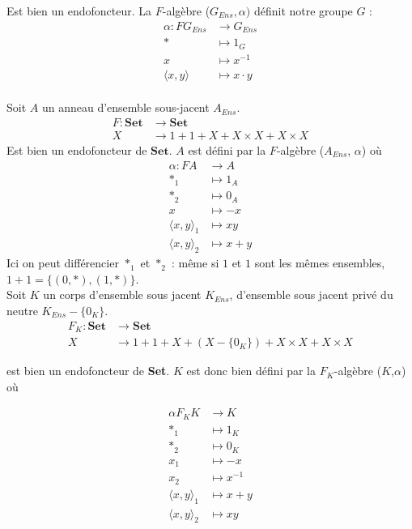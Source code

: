 \documentclass{article}
\begin{document}
Est bien un endofoncteur. La $F$-algèbre ($G_{Ens}, \alpha)$ définit notre groupe $G$ : 
\begin{align*}
    \alpha : F G_{Ens} & \rightarrow G_{Ens} \\
     * & \mapsto 1_G \\ 
     x & \mapsto x^{-1} \\ 
     \langle x,y \rangle & \mapsto x \cdot y
\end{align*}
\\ 
Soit $A$ un anneau d'ensemble sous-jacent $A_{Ens}$.
\begin{align*}
    F : \mathbf{Set}& \rightarrow \mathbf{Set} \\
      X & \rightarrow 1 + 1 + X + X \times X + X \times X
\end{align*}
Est bien un endofoncteur de $\mathbf{Set}$. $A$ est défini par la $F$-algèbre ($A_{Ens}$, $\alpha$) où 
\begin{align*}
    \alpha : F A & \rightarrow A \\
     *_1 & \mapsto 1_A \\
     *_2 & \mapsto 0_A \\ 
     x & \mapsto -x \\ 
      \langle x,y \rangle_1 & \mapsto xy \\ 
    \langle x,y \rangle_2 & \mapsto x+y
\end{align*}
Ici on peut différencier $*_1$ et $*_2$ : même si $1$ et $1$ sont les mêmes ensembles, $1+1 = \{ (0,*), (1,*) \}$. 
\\

Soit $K$ un corps d'ensemble sous jacent $K_{Ens}$, d'ensemble sous jacent privé du neutre $K_{Ens} - \{ 0_K \}$.
\begin{align*}
    F_K : \mathbf{Set} &  \rightarrow \mathbf{Set} \\
      X & \rightarrow 1 + 1 + X + (X - \{0_K\}) + X \times X + X \times X
\end{align*}

est bien un endofoncteur de \textbf{Set}. $K$ est donc bien défini par la $F_K$-algèbre ($K$,$\alpha$) où 

\begin{align*}
    \alpha F_K K & \rightarrow K \\ 
    *_1 &\mapsto 1_K \\ 
    *_2 &\mapsto 0_K \\ 
    x_1 &\mapsto -x \\
    x_2 &\mapsto x^{-1} \\ 
    \langle x,y \rangle_1 &\mapsto x+y \\ 
    \langle x,y \rangle_2 &\mapsto xy
\end{align*}
\end{document}
